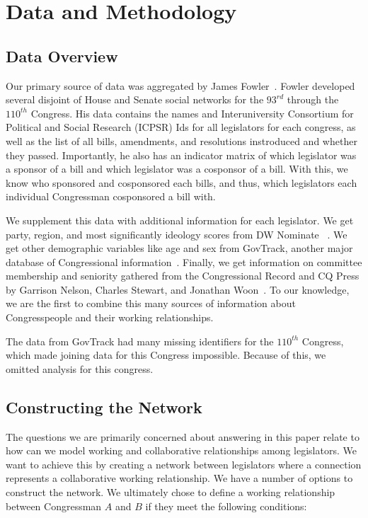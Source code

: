 \section{Data and Methodology}

\subsection{Data Overview}

Our primary source of data was aggregated by James Fowler~\cite{Fowler}. Fowler
developed several disjoint of House and Senate social networks for the $93^{rd}$
through the $110^{th}$ Congress. His data contains the names and Interuniversity
Consortium for Political and Social Research (ICPSR) Ids for all legislators for
each congress, as well as the list of all bills, amendments, and resolutions
instroduced and whether they passed. Importantly, he also has an indicator
matrix of which legislator was a sponsor of a bill and which legislator was a
cosponsor of a bill. With this, we know who sponsored and cosponsored each
bills, and thus,  which legislators each individual Congressman cosponsored a
bill with.

We supplement this data with additional information for each legislator. We get
party, region, and most significantly ideology scores from DW Nominate
~\cite{DW-NOMINATE}. We get other demographic variables like age and sex from
GovTrack, another major database of Congressional information~\cite{GovTrack}.
Finally, we get information on committee membership and seniority gathered from
the Congressional Record and CQ Press by Garrison Nelson, Charles Stewart, and
Jonathan Woon~\cite{Nelson, Stewart}. To our knowledge, we are the first to
combine this many sources of information about Congresspeople and their working
relationships.

The data from GovTrack had many missing identifiers for the $110^{th}$ Congress,
which made joining data for this Congress impossible. Because of this, we
omitted analysis for this congress.

\subsection{Constructing the Network}

The questions we are primarily concerned about answering in this paper relate 
to how can we model working and collaborative relationships among legislators. 
We want to achieve this by creating a network between legislators where a 
connection represents a collaborative working relationship. We have a number of 
options to construct the network. We ultimately chose to define a working 
relationship between Congressman $A$ and $B$ if they meet the following 
conditions:

